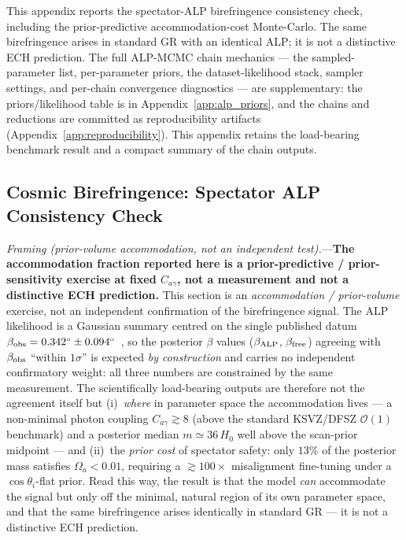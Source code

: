 \documentclass[aps,prd,twocolumn,superscriptaddress,showpacs,preprintnumbers,nofootinbib,longbibliography,floatfix]{revtex4-2}
\begin{document}
This appendix reports the spectator-ALP birefringence consistency check,
including the prior-predictive accommodation-cost Monte-Carlo. The same
birefringence arises in standard GR with an identical ALP; it is not a
distinctive ECH prediction. The full ALP-MCMC chain mechanics --- the
sampled-parameter list, per-parameter priors, the dataset-likelihood stack,
sampler settings, and per-chain convergence diagnostics --- are supplementary:
the priors/likelihood table is in Appendix~\ref{app:alp_priors}, and the chains
and reductions are committed as reproducibility
artifacts~\cite{BigBounceRepro} (Appendix~\ref{app:reproducibility}). This
appendix retains the load-bearing benchmark result and a compact summary of the
chain outputs.

\subsection{Cosmic Birefringence: Spectator ALP Consistency Check}\label{sec:p1b_birefringence_check}

\textit{Framing (prior-volume accommodation, not an independent test).}---\textbf{The
accommodation fraction reported here is a prior-predictive / prior-sensitivity exercise
at fixed $C_{a\gamma}$, not a measurement and not a distinctive ECH prediction.}
This section is an \emph{accommodation / prior-volume} exercise, not an independent
confirmation of the birefringence signal. The ALP likelihood is a Gaussian
summary centred on the single published datum
$\beta_{\rm obs}=0.342^\circ\pm 0.094^\circ$~\cite{Eskilt2022}, so the
posterior $\beta$ values ($\beta_{\rm ALP}$, $\beta_{\rm free}$) agreeing with
$\beta_{\rm obs}$ ``within $1\sigma$'' is expected \emph{by construction} and
carries no independent confirmatory weight: all three numbers are constrained
by the same measurement. The scientifically load-bearing outputs are therefore
not the agreement itself but (i)~\emph{where} in parameter space the
accommodation lives --- a non-minimal photon coupling $C_{a\gamma}\gtrsim 8$
(above the standard KSVZ/DFSZ $\mathcal{O}(1)$ benchmark) and a posterior
median $m\simeq 36\,H_0$ well above the scan-prior midpoint --- and
(ii)~the \emph{prior cost} of spectator safety: only $13\%$ of the posterior
mass satisfies $\Omega_a<0.01$, requiring a ${\gtrsim}100\times$ misalignment
fine-tuning under a $\cos\theta_i$-flat prior. Read this way, the result is
that the model \emph{can} accommodate the signal but only off the minimal,
natural region of its own parameter space, and that the same birefringence
arises identically in standard GR --- it is not a distinctive ECH prediction.
\end{document}
